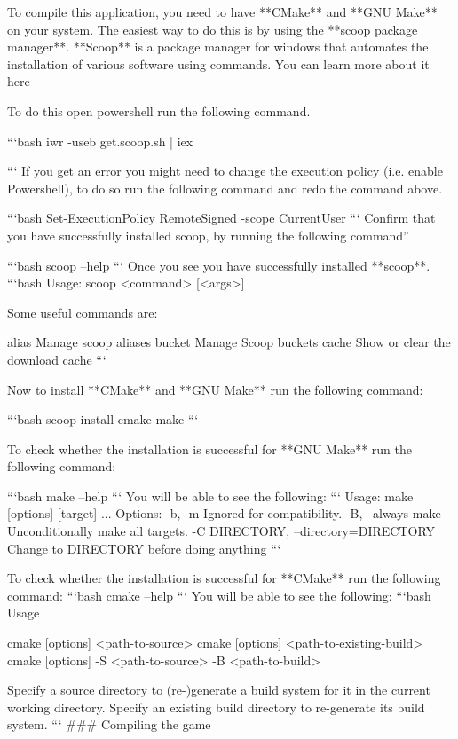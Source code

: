 To compile this application, you need to have **CMake**  and **GNU Make** on your system.  The easiest way to do this is by using the **scoop package manager**. **Scoop** is a package manager for windows that automates the installation of various software using commands. You can learn more about it here


 To do this open powershell run the following command.

```bash
iwr -useb get.scoop.sh | iex

```
If you get an error you might need to change the execution policy (i.e. enable Powershell), to do so run the following command and redo the command above.

```bash
Set-ExecutionPolicy RemoteSigned -scope CurrentUser
```
Confirm that you have successfully installed scoop, by running the following command”

```bash
scoop --help
```
Once you see  you have successfully installed **scoop**.
```bash
Usage: scoop <command> [<args>]

Some useful commands are:

alias       Manage scoop aliases
bucket      Manage Scoop buckets
cache       Show or clear the download cache
```

Now to install **CMake** and **GNU Make** run the following command:

```bash
scoop install cmake make 
```
 
To check whether the installation is successful for **GNU Make** run the following command:

```bash
make --help
```
You will be able to see the following:
```
Usage: make [options] [target] ...
Options:
  -b, -m                      Ignored for compatibility.
  -B, --always-make           Unconditionally make all targets.
  -C DIRECTORY, --directory=DIRECTORY
                              Change to DIRECTORY before doing anything
```

To check whether the installation is successful for **CMake** run the following command:
```bash
cmake --help
```
You will be able to see the following:
```bash
Usage

  cmake [options] <path-to-source>
  cmake [options] <path-to-existing-build>
  cmake [options] -S <path-to-source> -B <path-to-build>

Specify a source directory to (re-)generate a build system for it in the
current working directory.  Specify an existing build directory to
re-generate its build system.
```
### Compiling the game

